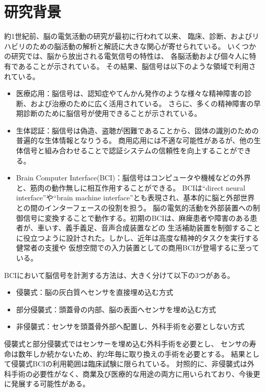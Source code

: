 \section{研究背景}

約1世紀前、脳の電気活動の研究が最初に行われて以来、
臨床、診断、およびリハビリのための脳活動の解析と解読に大きな関心が寄せられている。
いくつかの研究では、脳から放出される電気信号の特性は、
各脳活動および個々人に特有であることが示されている。
その結果、脳信号は以下のような領域で利用されている。
\begin{itemize}
    \item 医療応用：脳信号は、認知症やてんかん発作のような様々な精神障害の診断、および治療のために広く活用されている。
    さらに、多くの精神障害の早期診断のために脳信号が使用できることが示されている。
    \item 生体認証：脳信号は偽造、盗聴が困難であることから、固体の識別のための普遍的な生体情報となりうる。
    商用応用には不適な可能性があるが、他の生体信号と組み合わせることで認証システムの信頼性を向上することができる。
    \item Brain Computer Interface(BCI)：脳信号はコンピュータや機械などの外界と、筋肉の動作無しに相互作用することができる。
    BCIは``direct neural interface''や``brain machine interface''とも表現され、基本的に脳と外部世界との間のインターフェースの役割を担う。
    脳の電気的活動を外部装置への制御信号に変換することで動作する。初期のBCIは、麻痺患者や障害のある患者が、車いす、義手義足、音声合成装置などの
    生活補助装置を制御することに役立つように設計された。しかし、近年は高度な精神的タスクを実行する健常者の支援や
    仮想空間での入力装置としての商用BCIが登場するに至っている。
\end{itemize}
BCIにおいて脳信号を計測する方法は、大きく分けて以下の3つがある。
\begin{itemize}
    \item 侵襲式：脳の灰白質へセンサを直接埋め込む方式
    \item 部分侵襲式：頭蓋骨の内部、脳の表面へセンサを埋め込む方式
    \item 非侵襲式：センサを頭蓋骨外部へ配置し、外科手術を必要としない方式
\end{itemize}
侵襲式と部分侵襲式ではセンサーを埋め込む外科手術を必要とし、
センサの寿命は数年しか続かないため、約2年毎に取り換えの手術を必要とする。
結果として侵襲式BCIの利用範囲は臨床試験に限られている。
対照的に、非侵襲式は外科手術の必要性がなく、商業及び医療的な用途の両方に用いられており、今後更に発展する可能性がある。

